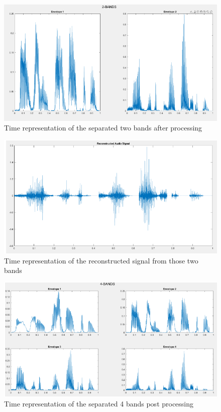 \documentclass{article}
\begin{document}
\begin{figure}[!ht]
\includegraphics[width=\textwidth]{2_bands.png}
\caption{Time representation of the separated two bands after processing}
\label{fig:2b}
\end{figure}

\begin{figure}[!ht]
\includegraphics[width=\textwidth]{2br.png}
\caption{Time representation of the reconstructed signal from those two bands}
\label{fig:2br}
\end{figure}

\begin{figure}[!ht]
\includegraphics[width=\textwidth]{4_bands.png}
\caption{Time representation of the separated 4 bands post processing}
\label{fig:4b}
\end{figure}
\end{document}
